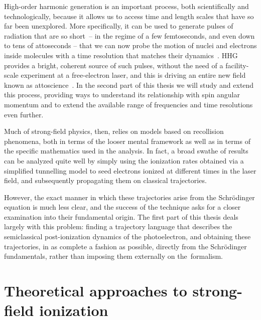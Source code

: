 High-order harmonic generation is an important process, both scientifically and technologically, because it allows us to access time and length scales that have so far been unexplored. More specifically, it can be used to generate pulses of radiation that are so short~-- in the regime of a few femtoseconds, and even down to tens of attoseconds -- that we can now probe the motion of nuclei and electrons inside molecules with a time resolution that matches their dynamics~\cite{ calegari_phenylalanine_2014}. HHG provides a bright, coherent source of such pulses, without the need of a facility-scale experiment at a free-electron laser, and this is driving an entire new field known as attoscience~\cite{corkum_hhg-review_2007, krausz-ivanov_attosecond-review_2009}. In the second part of this thesis we will study and extend this process, providing ways to understand its relationship with spin angular momentum and to extend the available range of frequencies and time resolutions even further.


Much of strong-field physics, then, relies on models based on recollision phenomena, both in terms of the looser mental framework as well as in terms of the specific mathematics used in the analysis. In fact, a broad swathe of results can be analyzed quite well by simply using the ionization rates obtained via a simplified tunnelling model to seed electrons ionized at different times in the laser field, and subsequently propagating them on classical trajectories. 

However, the exact manner in which these trajectories arise from the Schrödinger equation is much less clear, and the success of the technique asks for a closer examination into their fundamental origin. The first part of this thesis deals largely with this problem: finding a trajectory language that describes the semiclassical post-ionization dynamics of the photoelectron, and obtaining these trajectories, in as complete a fashion as possible, directly from the Schrödinger fundamentals, rather than imposing them externally on the~formalism.




\section{Theoretical approaches to strong-field ionization}
\label{sec:strong-field-basic-theory}

